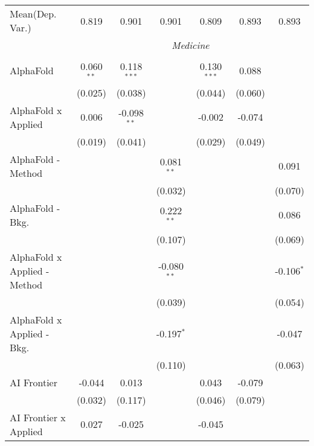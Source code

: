 \begin{tabular}{lcccccc}
Mean(Dep. Var.) & 0.819 & 0.901 & 0.901 & 0.809 & 0.893 & 0.893 \\
 & \multicolumn{6}{c}{\textit{Medicine}} \\ \\
   AlphaFold                      & 0.060$^{**}$ & 0.118$^{***}$ &                & 0.130$^{***}$ & 0.088   &   \\   
                                  & (0.025)      & (0.038)       &                & (0.044)       & (0.060) &   \\   
   AlphaFold x Applied            & 0.006        & -0.098$^{**}$ &                & -0.002        & -0.074  &   \\   
                                  & (0.019)      & (0.041)       &                & (0.029)       & (0.049) &   \\   
   AlphaFold - Method             &              &               & 0.081$^{**}$   &               &         & 0.091\\   
                                  &              &               & (0.032)        &               &         & (0.070)\\   
   AlphaFold - Bkg.               &              &               & 0.222$^{**}$   &               &         & 0.086\\   
                                  &              &               & (0.107)        &               &         & (0.069)\\   
   AlphaFold x Applied - Method   &              &               & -0.080$^{**}$  &               &         & -0.106$^{*}$\\   
                                  &              &               & (0.039)        &               &         & (0.054)\\   
   AlphaFold x Applied - Bkg.     &              &               & -0.197$^{*}$   &               &         & -0.047\\   
                                  &              &               & (0.110)        &               &         & (0.063)\\   
   AI Frontier                    & -0.044       & 0.013         &                & 0.043         & -0.079  &   \\   
                                  & (0.032)      & (0.117)       &                & (0.046)       & (0.079) &   \\   
   AI Frontier x Applied          & 0.027        & -0.025        &                & -0.045        &         &   \\   

\end{tabular}
